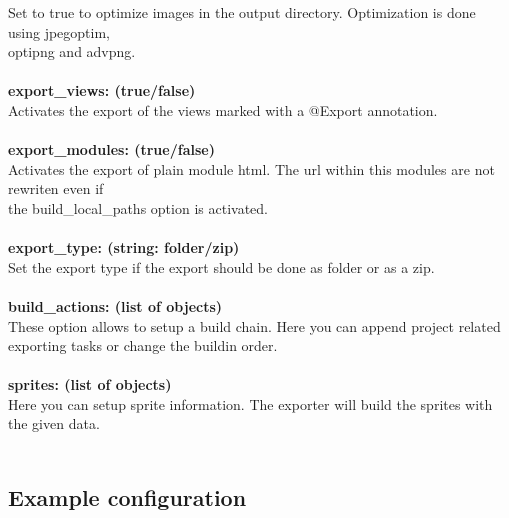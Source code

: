 \indent Set to true to optimize images in the output directory. Optimization is done using jpegoptim, \\optipng and advpng.\\
\\
\textbf{export\_views: (true/false)}\\
\indent Activates the export of the views marked with a @Export annotation.\\
\\
\textbf{export\_modules: (true/false)}\\
\indent Activates the export of plain module html. The url within this modules are not rewriten even if \\the build\_local\_paths option is activated.\\
\\
\textbf{export\_type: (string: folder/zip)}\\
\indent Set the export type if the export should be done as folder or as a zip.\\
\\
\textbf{build\_actions: (list of objects)}\\
\indent These option allows to setup a build chain. Here you can append project related exporting tasks or change the buildin order.\\
\\
\textbf{sprites: (list of objects)}\\
\indent Here you can setup sprite information. The exporter will build the sprites with the given data.\\
\\


\subsection{Example configuration}

